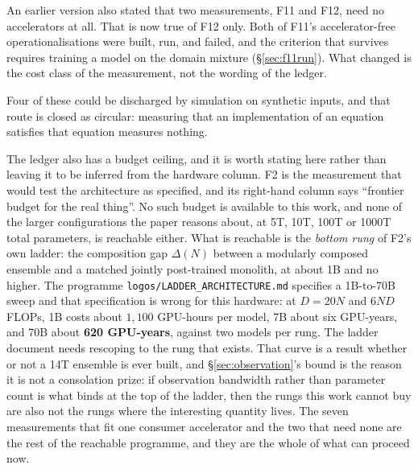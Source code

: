 \documentclass[11pt]{article}
\begin{document}
An earlier version also stated that two measurements, F11 and F12, need no accelerators at all. That is now true of F12 only. Both of F11's accelerator-free operationalisations were built, run, and failed, and the criterion that survives requires training a model on the domain mixture (\S\ref{sec:f11run}). What changed is the cost class of the measurement, not the wording of the ledger.

Four of these could be discharged by simulation on synthetic inputs, and that route is closed as circular: measuring that an implementation of an equation satisfies that equation measures nothing.

The ledger also has a budget ceiling, and it is worth stating here rather than leaving it to be inferred from the hardware column. F2 is the measurement that would test the architecture as specified, and its right-hand column says ``frontier budget for the real thing''. No such budget is available to this work, and none of the larger configurations the paper reasons about, at 5T, 10T, 100T or 1000T total parameters, is reachable either. What is reachable is the \emph{bottom rung} of F2's own ladder: the composition gap $\Delta(N)$ between a modularly composed ensemble and a matched jointly post-trained monolith, at about 1B and no higher. The programme \texttt{logos/LADDER\_ARCHITECTURE.md} specifies a 1B-to-70B sweep and that specification is wrong for this hardware: at $D=20N$ and $6ND$ FLOPs, 1B costs about $1{,}100$ GPU-hours per model, 7B about six GPU-years, and 70B about \textbf{620 GPU-years}, against two models per rung. The ladder document needs rescoping to the rung that exists. That curve is a result whether or not a 14T ensemble is ever built, and \S\ref{sec:observation}'s bound is the reason it is not a consolation prize: if observation bandwidth rather than parameter count is what binds at the top of the ladder, then the rungs this work cannot buy are also not the rungs where the interesting quantity lives. The seven measurements that fit one consumer accelerator and the two that need none are the rest of the reachable programme, and they are the whole of what can proceed now.
\end{document}
